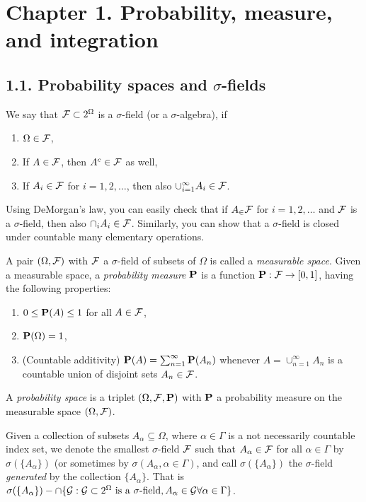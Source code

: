 \section*{Chapter 1. Probability, measure, and integration}
\subsection*{1.1. Probability spaces and $\sigma$-fields}
\begin{definition*}
We say that $\mathcal{F} \subset 2^\Omega$ is a $\sigma$-field (or a $\sigma$-algebra), if
\begin{enumerate}[label=(\alph*)]
\item $\Omega \in \mathcal{F}$,
\item If $A \in \mathcal{F}$, then $A^c \in \mathcal{F}$ as well,
\item If $A_i \in \mathcal{F}$ for $i = 1, 2, \dots$, then also $\cup_{i=1}^\infty A_i
	\in \mathcal{F}$.
\end{enumerate}
\end{definition*} 

\begin{remark*} 
Using DeMorgan's law, you can easily check that if $A_ \in \mathcal{F}$ for $i = 1, 2,
\dots$ and $\mathcal{F}$ is a $\sigma$-field, then also $\cap_i A_i \in \mathcal{F}$. Similarly,
you can show that a $\sigma$-field is closed under countable many elementary
operations.
\end{remark*} 

\begin{definition*}
A pair $(\Omega, \mathcal{F})$ with $\mathcal{F}$ a $\sigma$-field of subsets of $\Omega$ is
called a \emph{measurable space}. Given a measurable space, a \emph{probability
measure} $\mathbf{P}$ is a function $\mathbf{P}: \mathcal{F} \rightarrow [0, 1]$, having the following
properties:
\begin{enumerate}[label=(\alph*)]
\item $0 \le \mathbf{P}(A) \le 1$ for all $A \in \mathcal{F}$,
\item $\mathbf{P}(\Omega) = 1$,
\item (Countable additivity) $\mathbf{P}(A) = \sum_{n=1}^\infty \mathbf{P}(A_n)$ whenever $A =
\cup_{n=1}^\infty A_n$ is a countable union of disjoint sets $A_n \in \mathcal{F}$.
\end{enumerate}
A \emph{probability space} is a triplet $(\Omega, \mathcal{F}, \mathbf{P})$ with $\mathbf{P}$ a
probability measure on the measurable space $(\Omega, \mathcal{F})$.
\end{definition*} 

\begin{definition*}
Given a collection of subsets $A_\alpha \subseteq \Omega$, where $\alpha \in
\Gamma$ is a not necessarily countable index set, we denote the smallest
$\sigma$-field $\mathcal{F}$ such that $A_\alpha \in \mathcal{F}$ for all $\alpha \in \Gamma$ by
$\sigma(\{A_\alpha\})$ (or sometimes by $\sigma(A_\alpha, \alpha \in \Gamma)$,
and call $\sigma(\{A_\alpha\})$ the $\sigma$-field \emph{generated} by the collection
$\{A_\alpha\}$. That is
$\sigma(\{A_\alpha\}) - \cap \{ \mathcal{G} : \mathcal{G} \subset 2^\Omega
\text{ is a $\sigma$-field}, A_\alpha \in \mathcal{G} \forall \alpha \in
\Gamma\}$.
\end{definition*} 

